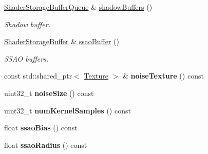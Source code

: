 \begin{Indent}
\begin{DoxyCompactItemize}
\mbox{\label{classrev_1_1_lighting_settings_a14c7e333337ebae0339d92b1e6aba94b}} 
\mbox{\hyperlink{classrev_1_1_buffer_queue}{Shader\+Storage\+Buffer\+Queue}} \& \mbox{\hyperlink{classrev_1_1_lighting_settings_a14c7e333337ebae0339d92b1e6aba94b}{shadow\+Buffers}} ()
\begin{DoxyCompactList}\small\item\em Shadow buffer. \end{DoxyCompactList}\item 
\mbox{\label{classrev_1_1_lighting_settings_a916e3416f01c731948a7b6ac140b51d0}} 
\mbox{\hyperlink{classrev_1_1_shader_storage_buffer}{Shader\+Storage\+Buffer}} \& \mbox{\hyperlink{classrev_1_1_lighting_settings_a916e3416f01c731948a7b6ac140b51d0}{ssao\+Buffer}} ()
\begin{DoxyCompactList}\small\item\em S\+S\+AO buffers. \end{DoxyCompactList}\item 
\mbox{\label{classrev_1_1_lighting_settings_a8f276d54d8012baf4a2fefb90d30ae0b}} 
const std\+::shared\+\_\+ptr$<$ \mbox{\hyperlink{classrev_1_1_texture}{Texture}} $>$ \& {\bfseries noise\+Texture} () const
\item 
\mbox{\label{classrev_1_1_lighting_settings_ad0d616bd78012da58d5d451fb7c97aea}} 
uint32\+\_\+t {\bfseries noise\+Size} () const
\item 
\mbox{\label{classrev_1_1_lighting_settings_a31308a19d20e73392cd92f3512685fd1}} 
uint32\+\_\+t {\bfseries num\+Kernel\+Samples} () const
\item 
\mbox{\label{classrev_1_1_lighting_settings_a4978a588e73288c27dfdbb05abad98b4}} 
float {\bfseries ssao\+Bias} () const
\item 
\mbox{\label{classrev_1_1_lighting_settings_acf9d24721ce663ab6ea39c4623e35712}} 
float {\bfseries ssao\+Radius} () const
\item 
\mbox{\label{classrev_1_1_lighting_settings_a80329ac21618fbc7ac570876a3cab780}} 

\end{DoxyCompactItemize}
\end{Indent}

